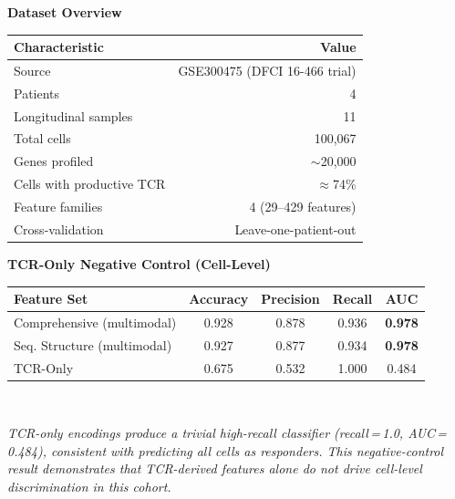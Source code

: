 \documentclass[border=14pt]{standalone}
\begin{document}

\vspace*{1cm}
\begin{center}
  {\Large\bfseries\textcolor{tealdark}{Dataset Overview}}\\[12pt]
  \begin{tabular}{@{} l r @{}}
    \toprule
    \textbf{Characteristic} & \textbf{Value} \\
    \midrule
    Source & GSE300475 (DFCI 16-466 trial) \\
    Patients & 4 \\
    Longitudinal samples & 11 \\
    Total cells & 100,067 \\
    Genes profiled & $\sim$20,000 \\
    Cells with productive TCR & $\approx$74\% \\
    Feature families & 4 (29--429 features) \\
    Cross-validation & Leave-one-patient-out \\
    \bottomrule
  \end{tabular}
\end{center}

\vspace{2.5cm}

\begin{center}
  {\Large\bfseries\textcolor{tealdark}{TCR-Only Negative Control (Cell-Level)}}\\[12pt]
  \begin{tabular}{@{} l c c c c @{}}
    \toprule
    \textbf{Feature Set} & \textbf{Accuracy} & \textbf{Precision} & \textbf{Recall} & \textbf{AUC} \\
    \midrule
    Comprehensive (multimodal) & 0.928 & 0.878 & 0.936 & \textbf{0.978} \\
    Seq. Structure (multimodal) & 0.927 & 0.877 & 0.934 & \textbf{0.978} \\
    \rowcolor{warmred!12}
    TCR-Only & 0.675 & 0.532 & 1.000 & 0.484 \\
    \bottomrule
  \end{tabular}\\[8pt]
  \begin{minipage}{0.75\textwidth}
    \normalsize\textit{TCR-only encodings produce a trivial high-recall classifier (recall\,=\,1.0, AUC\,=\,0.484), consistent with predicting all cells as responders. This negative-control result demonstrates that TCR-derived features alone do not drive cell-level discrimination in this cohort.}
  \end{minipage}
\end{center}
\end{document}
